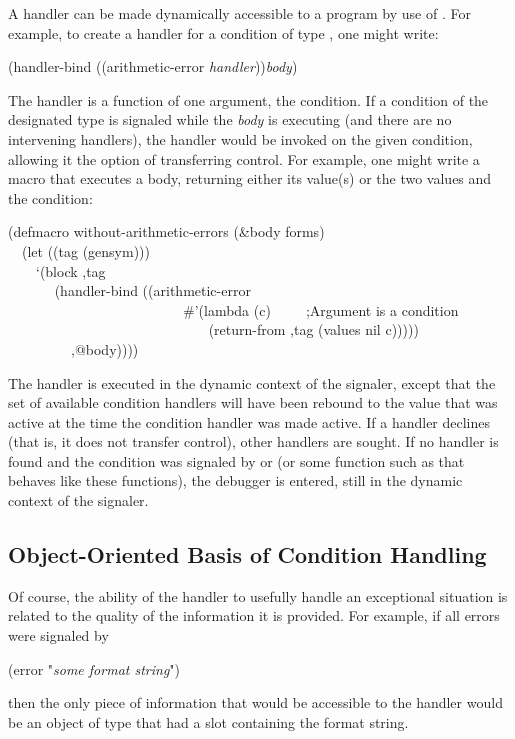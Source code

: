 A handler can be made dynamically accessible to a program by use of
. For example, to create a handler for a condition of type
, one might write:
\begingroup
\makeatletter
\def\@listi{\leftmargin\leftmargini \labelsep\leftmargin
   \parsep 3pt\relax
   \topsep 4pt plus 9pt\relax
   \itemsep\topsep}
\makeatother
\begin{lisp}
(handler-bind ((arithmetic-error {\it handler})){\it body})
\end{lisp}
The handler is a function of one argument, the condition. If a condition of
the designated type is signaled while the {\it body} is executing (and there are no
intervening handlers), the handler would be invoked on the given condition,
allowing it the option of transferring control. For example, one might write a
macro that executes a body, returning either its value(s) or the two values
 and the condition:
\begin{lisp}
(defmacro without-arithmetic-errors (\&body forms) \\
~~(let ((tag (gensym))) \\
~~~~`(block ,tag \\
~~~~~~ (handler-bind ((arithmetic-error \\
~~~~~~~~~~~~~~~~~~~~~~~~~\#'(lambda (c)~~~~~;{\rm Argument  is a condition} \\
~~~~~~~~~~~~~~~~~~~~~~~~~~~~ (return-from ,tag (values nil c))))) \\
~~~~~~~~~,@body)))) \\
\end{lisp}
\endgroup
The handler is executed in the dynamic context of the signaler, except
that the set of available condition handlers will have been rebound to
the value that was active at the time the condition handler was made
active. If a handler declines (that is, it does not transfer control), other 
handlers are sought. If no handler is found and the condition was signaled
by  or  (or some function such as  that behaves like
these functions), the debugger is entered, still in the dynamic context 
of the signaler.

\subsection{Object-Oriented Basis of Condition Handling}
\label{OBJECT-0RIENTED-BASIS}

Of course, the ability of the handler to usefully handle an exceptional
situation is related to the quality of the information it is provided. For
example, if all errors were signaled by
\begin{lisp}
(error "{\it some format string}")
\end{lisp}
then the only piece of information that would be accessible to the handler
would be an object of type  that had a slot containing the
format string.

